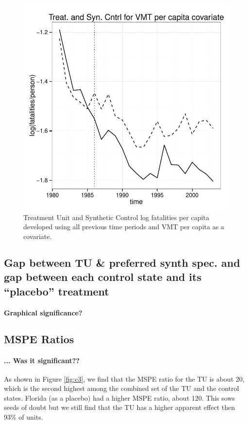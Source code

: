 \documentclass[letterpaper, 12pt]{article}
\begin{document}
\begin{figure}[htbp]
\begin{center}
\includegraphics{img-split-vmt.pdf}
\caption{Treatment Unit and Synthetic Control log fatalities per capita developed using all previous time periods and VMT per capita as a covariate.}
\label{fig:c16}
\end{center}
\end{figure}


\subsection{Gap between TU \& preferred synth spec. and gap between each control state and its ``placebo'' treatment}

\paragraph{Graphical significance?}


\subsection{MSPE Ratios}

\paragraph{... Was it significant??}  As shown in Figure \ref{fig:c3}, we find that the MSPE ratio for the TU is about 20, which is the second highest among the combined set of the TU and the control states.  Florida (as a placebo) had a higher MSPE ratio, about 120.  This sows seeds of doubt but we still find that the TU has a higher apparent effect then 93\% of units.  
\end{document}
